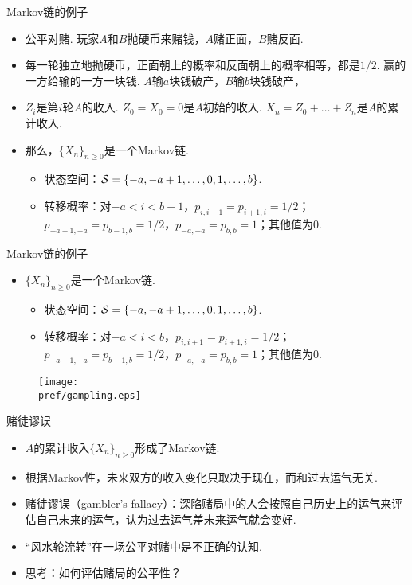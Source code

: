 {Markov链的例子}
\begin{itemize}
    \item 公平对赌. 玩家$A$和$B$抛硬币来赌钱，$A$赌正面，$B$赌反面.
    \item 每一轮独立地抛硬币，正面朝上的概率和反面朝上的概率相等，都是$1/2$. 赢的一方给输的一方一块钱. $A$输$a$块钱破产，$B$输$b$块钱破产，
    \item $Z_i$是第$i$轮$A$的收入. $Z_0=X_0=0$是$A$初始的收入. $X_n=Z_0+\dots+Z_n$是$A$的累计收入.
    \item 那么，$\{X_n\}_{n\geq 0}$是一个Markov链.
    \begin{itemize}
        \item 状态空间：$\mathcal S=\{-a,-a+1,\dots,0,1,\dots,b\}$.
        \item 转移概率：对$-a<i<b-1$，$p_{i,i+1}=p_{i+1,i}=1/2$；$p_{-a+1,-a}=p_{b-1,b}=1/2$，$p_{-a,-a}=p_{b,b}=1$；其他值为$0$.
    \end{itemize}
\end{itemize}


{Markov链的例子}
\begin{itemize}
    \item  $\{X_n\}_{n\geq 0}$是一个Markov链.
    \begin{itemize}
        \item 状态空间：$\mathcal S=\{-a,-a+1,\dots,0,1,\dots,b\}$.
        \item 转移概率：对$-a<i<b$，$p_{i,i+1}=p_{i+1,i}=1/2$；$p_{-a+1,-a}=p_{b-1,b}=1/2$，$p_{-a,-a}=p_{b,b}=1$；其他值为$0$.
    \end{itemize}
\end{itemize}
\begin{figure}[ht]
    \centering
    \texttt{[image: \\pref/gampling.eps]}
\end{figure}


{赌徒谬误}
\begin{itemize}
    \item $A$的累计收入$\{X_n\}_{n\geq 0}$形成了Markov链.
    \item 根据Markov性，未来双方的收入变化只取决于现在，而和过去运气无关.
    \item 赌徒谬误（gambler's fallacy）：深陷赌局中的人会按照自己历史上的运气来评估自己未来的运气，认为过去运气差未来运气就会变好.
    \item ``风水轮流转''在一场公平对赌中是不正确的认知.
    \item 思考：如何评估赌局的公平性？
\end{itemize}


